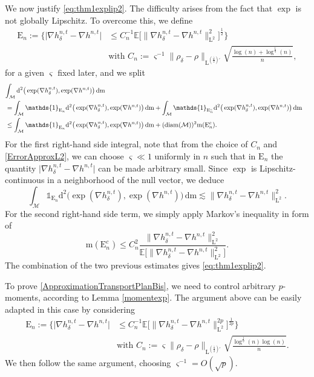 \documentclass[11pt,a4paper,oneside]{amsart}
\numberwithin{equation}{section}
\newcommand{\dd}{\mathrm{d}}
\newcommand{\LL}{\mathrm{L}}
\newcommand{\m}{\mathrm{m}}
\begin{document}
We now justify \eqref{eq:thm1explip2}. The difficulty arises from the fact that $\exp$ is not globally Lipschitz. To overcome this, we define
%
\begin{align*}
%
\mathrm{E}_n:=\Big\{\vert\nabla h^{n,t}_\delta-\nabla h^{n,t}\vert &\leq C^{-1}_n\mathbb{E}\big[\|\nabla h^{n,t}_\delta-\nabla h^{n,t}\|^{2}_{\LL^{2}}\big]^{\frac{1}{2}}\Big\}\\
& \text{with }C_n:=\varsigma^{-1}\|\rho_{\delta}-\rho\|_{\LL^{(\frac{\bar{q}}{2})'}}\sqrt{\frac{\log(n)+\log^{\frac{1}{\eta}}(n)}{n}},
%
\end{align*}
%
for a given $\varsigma$ fixed later, and we split
%
\begin{align*}
\lefteqn{\int_\mathcal{M} \dd^2 \big(\exp(\nabla h^{n,t}_\delta), \exp(\nabla h^{n,t})\big)\,\dd \m}\\
&= \int_\mathcal{M} \mathds{1}_{\mathrm{E}_n}\dd^2 \big(\exp(\nabla h^{n,t}_\delta), \exp(\nabla h^{n,t})\big)\,\dd \m+\int_\mathcal{M} \mathds{1}_{\mathrm{E}^c_n}\dd^2 \big(\exp(\nabla h^{n,t}_\delta), \exp(\nabla h^{n,t})\big)\,\dd \m\\
&\leq\int_\mathcal{M}\mathds{1}_{\mathrm{E}_n}\dd^2 \big(\exp(\nabla h^{n,t}_\delta), \exp(\nabla h^{n,t})\big)\,\dd \m+(\text{diam}(\mathcal{M}))^2 \m(\mathrm{E}^c_n).
\end{align*}
%
For the first right-hand side integral, note that from the choice of $C_n$ and \eqref{ErrorApproxL2}, we can choose $\varsigma\ll 1$ uniformly in $n$ such that in $\mathrm{E}_n$ the quantity $\vert\nabla h^{n,t}_{\delta}-\nabla h^{n,t}\vert$ can be made arbitrary small. Since $\exp$ is Lipschitz-continuous in a neighborhood of the null vector, we deduce 
%
$$\int_\mathcal{M}\mathds{1}_{\mathrm{E}_n}\dd^2 \big(\exp(\nabla h^{n,t}_\delta), \exp(\nabla h^{n,t})\big)\,\dd\m\lesssim \|\nabla h^{n,t}_\delta-\nabla h^{n,t}\|^2_{\LL^{2}}.$$
%
For the second right-hand side term, we simply apply Markov's inequality in form of
%
$$\m(\mathrm{E}^c_n)\leq C^2_n\frac{\|\nabla h^{n,t}_\delta-\nabla h^{n,t}\|^2_{\LL^{2}}}{\mathbb{E}\big[\|\nabla h^{n,t}_\delta-\nabla h^{n,t}\|^{2}_{\LL^{2}}\big]}.$$
%
The combination of the two previous estimates gives \eqref{eq:thm1explip2}.

%
\medskip
%

To prove \eqref{ApproximationTransportPlanBis}, we need to control arbitrary $p$-moments, according to Lemma \ref{momentexp}. The argument above can be easily adapted in this case by considering 
%
\begin{align*}
%
\mathrm{E}_n:=\Big\{\vert\nabla h^{n,t}_\delta-\nabla h^{n,t}\vert &\leq C^{-1}_n\mathbb{E}\big[\|\nabla h^{n,t}_\delta-\nabla h^{n,t}\|^{2p}_{\LL^{2}}\big]^{\frac{1}{2p}}\Big\}\\
& \text{with }C_n:=\varsigma\|\rho_{\delta}-\rho\|_{\LL^{(\frac{\bar{q}}{2})'}}\sqrt{\frac{\log^{\frac{1}{\eta}}(n)\log(n)}{n}}.
%
\end{align*}
%
We then follow the same argument, choosing $\varsigma^{-1}=O(\sqrt{p})$.
\end{document}
